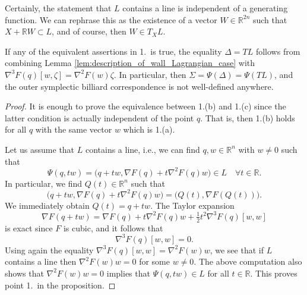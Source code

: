\documentclass[10pt,a4paper]{amsart}
\newcommand{\R}{{\mathbb R}}
\begin{document}
\begin{remark}
{\rm
Certainly, the statement that $L$ contains a line is independent of a generating function. We can rephrase this as the existence of a vector $W\in\R^{2n}$ such that $X+\R W\subset L$, and of course, then $W\in T_XL$.

If any of the equivalent assertions in 1.~is true, the equality $\Delta=TL$ follows from combining Lemma \ref{lem:description_of_wall_Lagrangian_case} with $\nabla^3F(q)[w,\zeta]=\nabla^2F(w)\zeta$. In particular, then $\Sigma=\Psi(\Delta)=\Psi(TL)$, and the outer symplectic billiard correspondence is not well-defined anywhere.
} 
\end{remark}

\begin{proof}
It is enough to prove the equivalence between 1.(b) and 1.(c) since the latter condition is actually independent of the point $q$. That is, then 1.(b) holds for all $q$ with the same vector $w$ which is 1.(a).

Let us assume that $L$ contains a line, i.e., we can find $q,w\in\R^n$ with $w\neq0$ such that
\begin{equation}\nonumber
\Psi(q,tw)=\big(q+tw,\nabla F(q)+t\nabla^2F(q)w\big)\in L\quad\forall t\in\R.
\end{equation}
In particular, we find $Q(t)\in\R^n$ such that
\begin{equation}\nonumber
\big(q+tw,\nabla F(q)+t\nabla^2F(q)w\big)=\big(Q(t),\nabla F(Q(t))\big).
\end{equation}
We immediately obtain $Q(t)=q+tw$. The Taylor expansion 
\begin{equation}\nonumber
\nabla F(q+tw)=\nabla F(q) +t \nabla^2F(q)w+\tfrac12t^2\nabla^3F(q)[w,w]
\end{equation}
is exact since $F$ is cubic, and it follows that
\begin{equation}\nonumber
\nabla^3F(q)[w,w]=0.
\end{equation}
Using again the equality $\nabla^3F(q)[w,w]=\nabla^2F(w)w$, we see that if $L$ contains a line then $\nabla^2F(w)w=0$ for some $w\neq0$. The above computation also shows that $\nabla^2F(w)w=0$ implies that $\Psi(q,tw)\in L$ for all $t\in\R$. This proves point 1.~in the proposition.


\end{proof}
\end{document}
